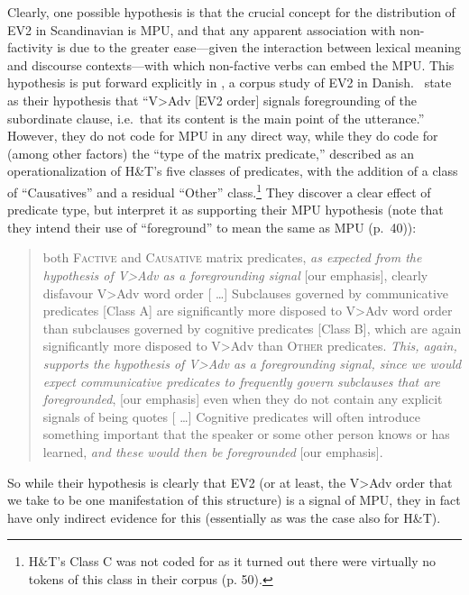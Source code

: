 \documentclass[output=paper]{LSP/langsci}
\begin{document}
Clearly, one possible hypothesis is that the crucial concept for the distribution of EV2 in Scandinavian is MPU, and that any apparent association with non-factivity is due to the greater ease---given the interaction between lexical meaning and discourse contexts---with which non-factive verbs can embed the MPU. This hypothesis is put forward explicitly in \cite{jensen-christensen13}, a corpus study of EV2 in Danish.\ \cite{jensen-christensen13} state as their hypothesis that 
``V\textgreater Adv [EV2 order] signals foregrounding of the subordinate clause, i.e.\ that its content is the main point of the utterance.''  However, they do not code for MPU in any direct way, while they do code for (among other factors)  the ``type of the matrix predicate,'' described as an operationalization of H\&T's five classes of predicates, with the addition of   a class of ``Causatives'' and a residual ``Other'' class.\footnote{H\&T's Class C was not coded for as it turned out there were virtually no tokens of this class in their corpus (p. 50).}   They discover a clear effect of predicate type, but interpret it as supporting their MPU hypothesis (note that they intend their use of ``foreground'' to mean the same as MPU (p.~40)):
\begin{quotation}
\noindent [ \ldots ] both \textsc{Factive} and \textsc{Causative} matrix predicates, \textit{as expected from the hypothesis of V\textgreater Adv as a foregrounding signal} [our emphasis], clearly disfavour V\textgreater Adv word order [ \ldots ] Subclauses governed by communicative predicates [Class A] are significantly more disposed to V\textgreater Adv word order than subclauses governed by cognitive predicates [Class B], which are again significantly more disposed to V\textgreater Adv than \textsc{Other} predicates. \textit{This, again, supports the hypothesis of V\textgreater Adv as a foregrounding signal, since we would expect communicative predicates to frequently govern subclauses that are foregrounded}, [our emphasis]  even when they do not contain any explicit signals of being quotes   [ \ldots ] Cognitive predicates will often introduce something important that the speaker or some other person knows or has learned, \textit{and these would then be foregrounded} [our emphasis]. \citep[p.~50]{jensen-christensen13}
\end{quotation}
So while their hypothesis is clearly that EV2 (or at least, the V\textgreater Adv order that we take to be one manifestation of this structure) is a signal of MPU, they in fact have only indirect evidence for this (essentially as was the case also for H\&T).
\end{document}
